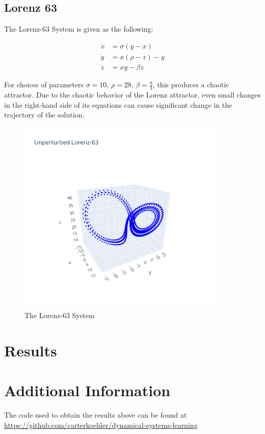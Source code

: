 \documentclass[12pt]{article}
\begin{document}
\subsection{Lorenz 63}

The Lorenz-63 System is given as the following:

\begin{align*}
  \dot{x} &= \sigma (y - x)\\
  \dot{y} &= x ( \rho - z ) - y\\
  \dot{z} &= x y - \beta z
\end{align*}

For choices of parameters $\sigma=10,\, \rho=28,\, \beta=\frac{8}{3}$, this produces a chaotic attractor. Due to the chaotic behavior of the Lorenz attractor, even small changes in the right-hand side of its equations can cause significant change in the trajectory of the solution.

\begin{figure}[ht]
  \centering
  \includegraphics[width=0.9\textwidth]{lorenz-unperturbed.png}
  \caption{The Lorenz-63 System}
\end{figure}




\section{Results}






\section{Additional Information}

The code used to obtain the results above can be found at \url{https://github.com/carterkoehler/dynamical-systems-learning}





\pagebreak


\end{document}
